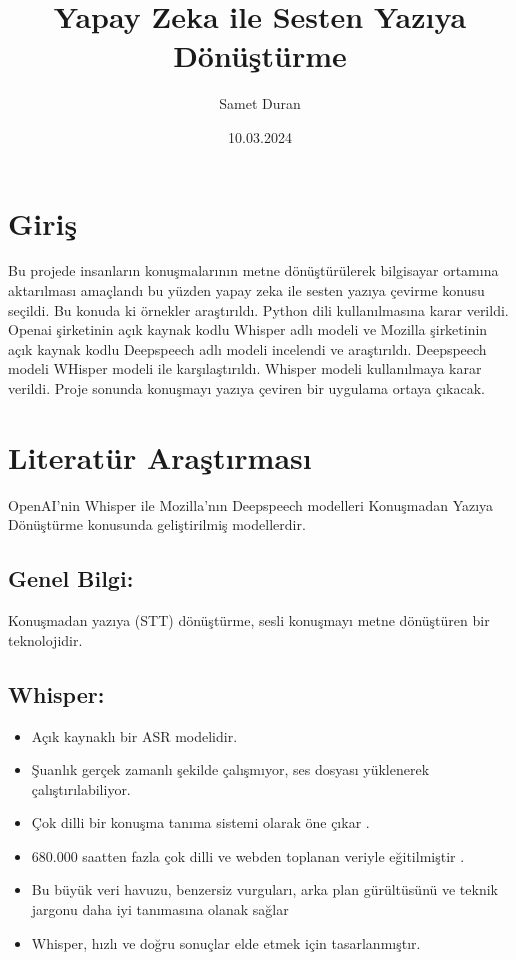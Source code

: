 \documentclass{article}
\title{Yapay Zeka ile Sesten Yazıya Dönüştürme}
\author{Samet Duran}
\date{10.03.2024}
\begin{document}
	\maketitle
	\newpage
	\section{Giriş}
	Bu projede insanların konuşmalarının metne dönüştürülerek bilgisayar ortamına aktarılması amaçlandı bu yüzden yapay zeka ile sesten yazıya çevirme konusu seçildi. Bu konuda ki örnekler araştırıldı. Python dili kullanılmasına karar verildi. Openai şirketinin açık kaynak kodlu Whisper adlı modeli ve Mozilla şirketinin açık kaynak kodlu Deepspeech adlı modeli incelendi ve araştırıldı. Deepspeech modeli WHisper modeli ile karşılaştırıldı. Whisper modeli kullanılmaya karar verildi. Proje sonunda konuşmayı yazıya çeviren bir uygulama ortaya çıkacak.
	 
	\section{Literatür Araştırması}
	OpenAI'nin Whisper ile Mozilla'nın Deepspeech modelleri Konuşmadan Yazıya Dönüştürme konusunda geliştirilmiş modellerdir.
	
	\subsection{Genel Bilgi:}
	
	Konuşmadan yazıya (STT) dönüştürme, sesli konuşmayı metne dönüştüren bir teknolojidir.
	
	\subsection{Whisper:}
	\begin{itemize}
		\item Açık kaynaklı bir ASR modelidir.
		\item Şuanlık gerçek zamanlı şekilde çalışmıyor, ses dosyası yüklenerek çalıştırılabiliyor.
		\item Çok dilli bir konuşma tanıma sistemi olarak öne çıkar \cite{openaig}.
		\item 680.000 saatten fazla çok dilli ve webden toplanan veriyle eğitilmiştir \cite{openai}.
		\item Bu büyük veri havuzu, benzersiz vurguları, arka plan gürültüsünü ve teknik jargonu daha iyi tanımasına olanak sağlar
		\item Whisper, hızlı ve doğru sonuçlar elde etmek için tasarlanmıştır.
	\end{itemize}
	
\end{document}
